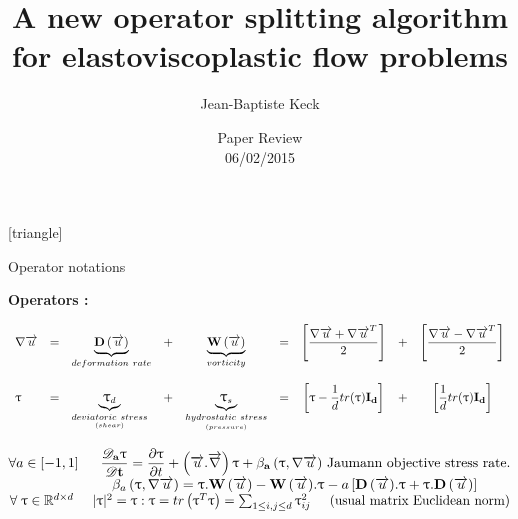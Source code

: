 




[triangle]




\title{\Large A new operator splitting algorithm for elastoviscoplastic flow problems}
\author[Keck]{\Large Jean-Baptiste Keck}
\date{\large Paper Review\\ 06/02/2015}



\begin{frame}
    \titlepage
\end{frame}



\begin{frame}{Operator notations} 

    \textbf{Operators :}
    \vskip 0.3cm
    \tiny

$
\begin{array}{l l l c c l c l c}
    \gradv& = & 
    \underbrace{\D}_{deformation\ rate}& + & \underbrace{\W}_{vorticity}& = &
    \left[\dfrac{\gradv + \gradv^T}{2}\right]& + & \left[\dfrac{\gradv - \gradv^T}{2}\right] \\
    \\
    \Tau & = & \underbrace{\Tau_d}_{\underset{(shear)}{deviatoric\ stress}}& + & \underbrace{\Tau_s}_{\underset{(pressure)}{hydrostatic\ stress}} &
    = & \left[\Tau - \dfrac{1}{d}tr(\Tau)\tensor{I_d}\right]& + & \left[\dfrac{1}{d}tr(\Tau)\tensor{I_d}\right]
\end{array}
$
    
\vskip 0.5cm
$
\forall a \in \left[ -1,1\right] \hspace{0.5cm}
\tensor{\od{\Tau}{t}} = \pd{\Tau}{t} + \left(\v . \grad \right) \Tau + \tensor{\beta_a \left( \Tau, \gradv \right)}
\textrm{ Jaumann objective stress rate.}
$
\vskip 0.5cm
$
\hskip 2.6cm
\beta_a \left( \Tau, \gradv \right) = \Tau . \W - \W . \Tau - a \left[ \D.\Tau + \Tau . \D \right]
$
\vskip 0.5cm
$
\forall \; \Tau \in \mathbb{R}^{d \times d} \hskip 0.5cm
|\Tau|^2=
\Tau : \Tau =
tr\left(\Tau^T \Tau \right) =
\sum_{1\leq i,j \leq d}\Tau_{ij}^2 \hskip 0.5cm \textrm{(usual matrix Euclidean norm)}
$

\end{frame}


